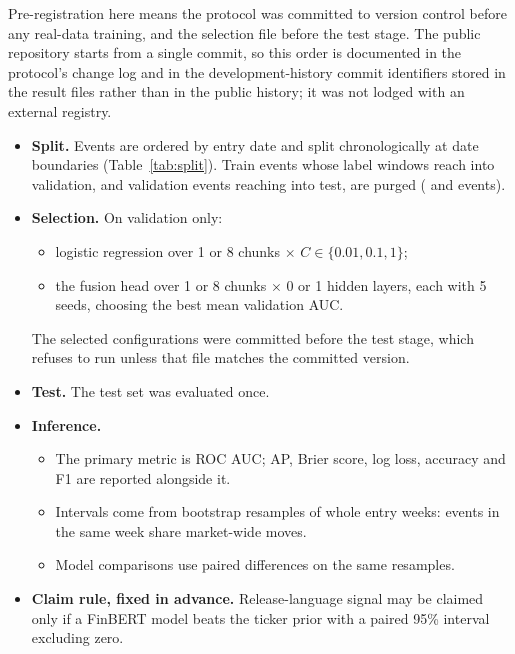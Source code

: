 \documentclass[11pt]{article}
\begin{document}
Pre-registration here means the protocol was committed to version control before any real-data
training, and the selection file before the test stage. The public repository starts from a single
commit, so this order is documented in the protocol's change log and in the development-history
commit identifiers stored in the result files rather than in the public history; it was not lodged
with an external registry.
\begin{itemize}
  \item \textbf{Split.} Events are ordered by entry date and split chronologically at date
  boundaries (Table~\ref{tab:split}). Train events whose label windows reach into validation, and
  validation events reaching into test, are purged (\purgedTrain{} and \purgedVal{} events).
  \item \textbf{Selection.} On validation only:
  \begin{itemize}
    \item logistic regression over 1 or 8 chunks $\times$ $C\in\{0.01,0.1,1\}$;
    \item the fusion head over 1 or 8 chunks $\times$ 0 or 1 hidden layers, each with 5 seeds,
    choosing the best mean validation AUC.
  \end{itemize}
  The selected configurations were committed before the test stage, which refuses to run unless that
  file matches the committed version.
  \item \textbf{Test.} The test set was evaluated once.
  \item \textbf{Inference.}
  \begin{itemize}
    \item The primary metric is ROC AUC; AP, Brier score, log loss, accuracy and F1 are reported
    alongside it.
    \item Intervals come from \nBoot{} bootstrap resamples of whole entry weeks: events in the same
    week share market-wide moves.
    \item Model comparisons use paired differences on the same resamples.
  \end{itemize}
  \item \textbf{Claim rule, fixed in advance.} Release-language signal may be claimed only if a
  FinBERT model beats the ticker prior with a paired 95\% interval excluding zero.
\end{itemize}

\begin{table}[t]
\centering
\caption{Chronological split of the document-only dataset (after purging).}
\label{tab:split}

\end{table}
\end{document}
